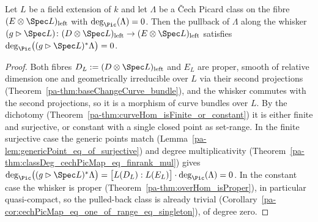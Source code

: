 \begin{theorem}
  \label{pa-thm:classDeg_cechPicMap_whiskerRight_eq_zero}
  \leanok

  Let \(L\) be a field extension of \(k\) and let \(\Lambda\) be a \v Cech Picard class
  on the fibre \((E \otimes \Spec L)_{\mathrm{left}}\) with
  \(\deg_{\Pic}(\Lambda) = 0\). Then the pullback of \(\Lambda\) along the whisker
  \((g \rhd \Spec L) \colon (D \otimes \Spec L)_{\mathrm{left}} \to
  (E \otimes \Spec L)_{\mathrm{left}}\) satisfies
  \(\deg_{\Pic}\bigl((g \rhd \Spec L)^{*}\Lambda\bigr) = 0\).
\end{theorem}
\begin{proof}
  \leanok
  Both fibres \(D_L := (D \otimes \Spec L)_{\mathrm{left}}\) and \(E_L\) are proper,
  smooth of relative dimension one and geometrically irreducible over \(L\) via their
  second projections (Theorem~\ref{pa-thm:baseChangeCurve_bundle}), and the whisker
  commutes with the second projections, so it is a morphism of curve bundles over
  \(L\). By the dichotomy (Theorem~\ref{pa-thm:curveHom_isFinite_or_constant}) it is
  either finite and surjective, or constant with a single closed point as set-range.
  In the finite surjective case the generic points match
  (Lemma~\ref{pa-lem:genericPoint_eq_of_surjective}) and degree multiplicativity
  (Theorem~\ref{pa-thm:classDeg_cechPicMap_eq_finrank_mul}) gives
  \(\deg_{\Pic}\bigl((g \rhd \Spec L)^{*}\Lambda\bigr)
    = \bigl[L(D_L) : L(E_L)\bigr] \cdot \deg_{\Pic}(\Lambda) = 0\).
  In the constant case the whisker is proper (Theorem~\ref{pa-thm:overHom_isProper}), in
  particular quasi-compact, so the pulled-back class is already trivial
  (Corollary~\ref{pa-cor:cechPicMap_eq_one_of_range_eq_singleton}), of degree zero.
\end{proof}

